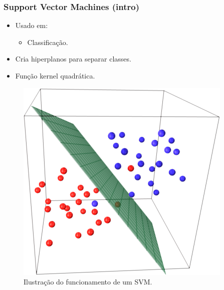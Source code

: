 \documentclass{beamer}
\begin{document}
\begin{frame}

	\frametitle{Support Vector Machines (intro)}
	
	\begin{minipage}{.45\textwidth}
	
		\begin{itemize}
			\item Usado em:
			\begin{itemize}
				\item Classificação.
			\end{itemize}
			\item Cria hiperplanos para separar classes.
			\item Função kernel quadrática.
		\end{itemize}
	
	\end{minipage}
	\begin{minipage}{.5\textwidth}
		\begin{figure}
			\includegraphics[width=\linewidth]{svm01.png}
  			\caption{Ilustração do funcionamento de um SVM.}
  			\label{fig:svm1}
		\end{figure}
	\end{minipage}
	
\end{frame}
\end{document}
